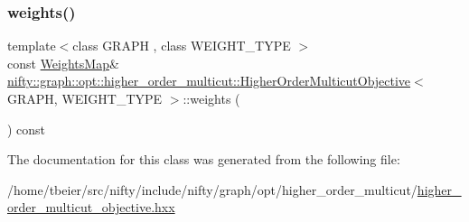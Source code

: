 \subsubsection{\texorpdfstring{weights()}{weights()}\hspace{0.1cm}{\footnotesize\ttfamily [2/2]}}
{\footnotesize\ttfamily template$<$class G\+R\+A\+PH , class W\+E\+I\+G\+H\+T\+\_\+\+T\+Y\+PE $>$ \\
const \hyperlink{classnifty_1_1graph_1_1opt_1_1higher__order__multicut_1_1HigherOrderMulticutObjective_ae3dca1bc16e023da893b0a69d01d6382}{Weights\+Map}\& \hyperlink{classnifty_1_1graph_1_1opt_1_1higher__order__multicut_1_1HigherOrderMulticutObjective}{nifty\+::graph\+::opt\+::higher\+\_\+order\+\_\+multicut\+::\+Higher\+Order\+Multicut\+Objective}$<$ G\+R\+A\+PH, W\+E\+I\+G\+H\+T\+\_\+\+T\+Y\+PE $>$\+::weights (\begin{DoxyParamCaption}{ }\end{DoxyParamCaption}) const\hspace{0.3cm}{\ttfamily [inline]}}



The documentation for this class was generated from the following file\+:\begin{DoxyCompactItemize}
\item 
/home/tbeier/src/nifty/include/nifty/graph/opt/higher\+\_\+order\+\_\+multicut/\hyperlink{higher__order__multicut__objective_8hxx}{higher\+\_\+order\+\_\+multicut\+\_\+objective.\+hxx}\end{DoxyCompactItemize}
